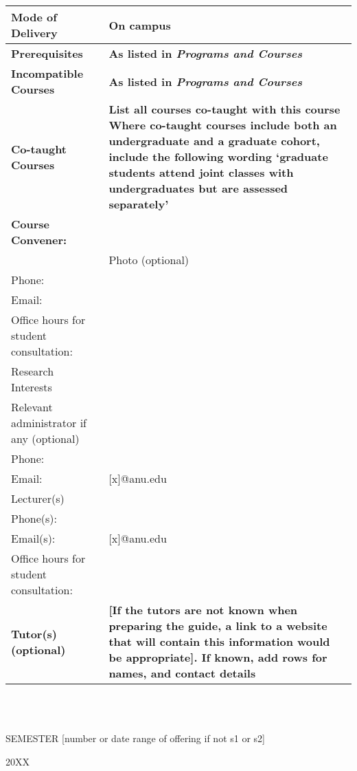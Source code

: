 \documentclass[11pt]{article}
\begin{document}
\begin{tabular}{| p{5cm} | p{10cm} |}
	\hline
	\textbf{Mode of Delivery} & \textbf{{On campus}} \\ \hline
	\textbf{Prerequisites} & \textbf{{\color{red} As listed in \textit{Programs and Courses}}} \\ \hline
	\textbf{Incompatible Courses }& \textbf{{\color{red}As listed in \textit{Programs and Courses}}} \\ \hline
	\textbf{Co-taught Courses} & \textbf{{\color{red}List all courses co-taught with this course	\newline \newline Where co-taught courses include both an undergraduate and a graduate cohort, include the following wording ‘graduate students attend joint classes with undergraduates but are assessed separately’}} \\ \hline
	\textbf{Course Convener:} & \\ \hline
	       & Photo (optional) \\ \hline %
	Phone: &  \\ \hline
	Email: &  \\ \hline
	Office hours for student \newline consultation: &  \\ \hline
	Research Interests & \\ \hline
	Relevant administrator if \newline any (optional) & \\ \hline
	Phone: & \\ \hline
	Email: & [x]@anu.edu \\ \hline
	Lecturer(s) & \\ \hline
	Phone(s): & \\ \hline
	Email(s): & [x]@anu.edu \\ \hline
	Office hours for student \newline consultation: &  \\ \hline
	\textbf{Tutor(s) (optional)} & \textbf{{\color{red}[If the tutors are not known when preparing the guide, a link to a website that will contain this
	information would be appropriate]. If known, add rows for names, and contact details}} \\ \hline
\end{tabular} \\ \\

\centerline{SEMESTER {\color{red}[number or date range of offering if not s1 or s2]}}
\centerline{20XX}
\end{document}
